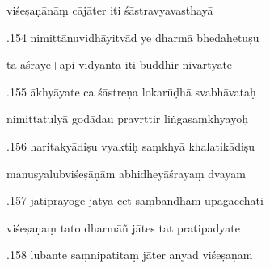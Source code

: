 \documentclass[article,12pt,a4paper]{memoir}%
\newcounter{parCount}
\begin{document}
	  
	  \pstart \leavevmode%
	viśeṣaṇānāṃ cājāter iti śāstravyavasthayā 
	{}
	\pend%
      

	  
	  \pstart {}.154 nimittānuvidhāyitvād ye dharmā bhedahetuṣu 
	{}
	\pend%
      

	  
	  \pstart \leavevmode%
	ta āśraye+api vidyanta iti buddhir nivartyate 
	{}
	\pend%
      

	  
	  \pstart {}.155 ākhyāyate ca śāstreṇa lokarūḍhā svabhāvataḥ 
	{}
	\pend%
      

	  
	  \pstart \leavevmode%
	nimittatulyā godādau pravṛttir liṅgasaṃkhyayoḥ 
	{}
	\pend%
      

	  
	  \pstart {}.156 haritakyādiṣu vyaktiḥ saṃkhyā khalatikādiṣu 
	{}
	\pend%
      

	  
	  \pstart \leavevmode%
	manuṣyalubviśeṣāṇām abhidheyāśrayaṃ dvayam 
	{}
	\pend%
      

	  
	  \pstart {}.157 jātiprayoge jātyā cet saṃbandham upagacchati 
	{}
	\pend%
      

	  
	  \pstart \leavevmode%
	viśeṣaṇaṃ tato dharmāñ jātes tat pratipadyate 
	{}
	\pend%
      

	  
	  \pstart {}.158 lubante saṃnipatitaṃ jāter anyad viśeṣaṇam 
	{}
	\pend%
      
\end{document}
